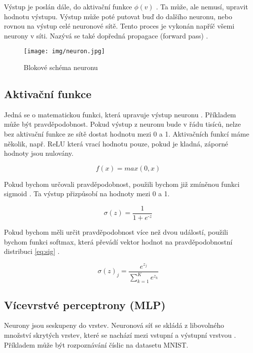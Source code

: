 \documentclass[FM,DP]{tulthesis}
\begin{document}
		
		Výstup je poslán dále, do aktivační funkce $\phi(v)$ . Ta může, ale nemusí, upravit hodnotu výstupu. Výstup může poté putovat buď do dalšího neuronu, nebo rovnou na výstup celé neuronové sítě. Tento proces je vykonán napříč všemi neurony v síti. Nazývá se také dopředná propagace (forward pass) \cite{general}.
		
		\begin{figure}[H]
			\centering
			\texttt{[image: img/neuron.jpg]}
			\caption{Blokové schéma neuronu \cite{dzone}}
			\label{fig:neuron}
		\end{figure}
		
		\subsection{Aktivační funkce}
		Jedná se o matematickou funkci, která upravuje výstup neuronu \cite{deepai_act}. Příkladem může být pravděpodobnost. Pokud výstup z neuronu bude v řádu tisíců, nelze bez aktivační funkce ze sítě dostat hodnotu mezi 0 a 1. Aktivačních funkcí máme několik, např. ReLU která vrací hodnotu pouze, pokud je kladná, záporné hodnoty jsou nulovány.
		

			\begin{equation}
				f(x) = max(0,x)
			\end{equation}

	
		Pokud bychom určovali pravděpodobnost, použili bychom již zmíněnou funkci sigmoid \cite{act_func}. Ta výstup přizpůsobí na hodnoty mezi 0 a 1.

			\begin{equation}\label{eq:sig}
				\sigma(z) = \frac{1}{1 + e^{‑z}}
			\end{equation}

	
		Pokud bychom měli určit pravděpodobnost více než dvou událostí, použili bychom funkci softmax, která převádí vektor hodnot na pravděpodobnostní distribuci \ref{eq:sig} \cite{neuralnetwork101_act}.

			\begin{equation}
				\sigma(z)_j = \frac{e^{z_j}}{\sum_{k=1}^K e^{z_k}}
			\end{equation}

		
		\subsection{Vícevrstvé perceptrony (MLP)}
		Neurony jsou seskupeny do vrstev. Neuronová síť se skládá z libovolného množství skrytých vrstev, které se nachází mezi vstupní a výstupní vrstvou \cite{neuralnetwork101}. Příkladem může být rozpoznávání číslic na datasetu MNIST. 
		
\end{document}
